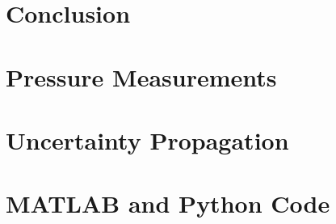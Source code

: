\documentclass[runningheads]{llncs}
\begin{document}


\section{Conclusion}










\appendix

\section{Pressure Measurements}

\section{Uncertainty Propagation}

\section{MATLAB and Python Code}
\end{document}
